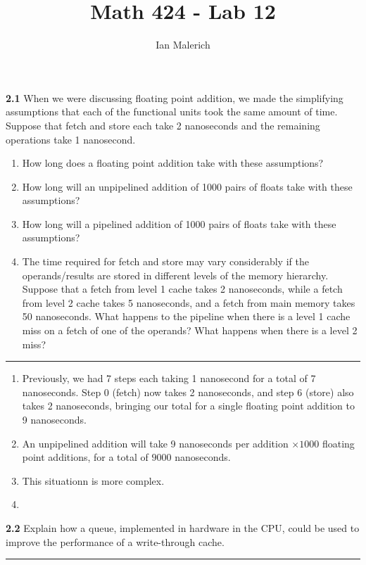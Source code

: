 \documentclass[12pt]{jhwhw}
\author{Ian Malerich}
\title{Math 424 - Lab 12}
\begin{document}
\raggedright


\textbf{2.1}
	When we were discussing floating point addition, we made the simplifying
	assumptions that each of the functional units took the same amount of time.
	Suppose that fetch and store each take 2 nanoseconds and the remaining
	operations take 1 nanosecond.
	\begin{enumerate}
		\item How long does a floating point addition take with these assumptions?
		\item How long will an unpipelined addition of 1000 pairs of floats take
			with these assumptions?
		\item How long will a pipelined addition of 1000 pairs of floats take with
			these assumptions?
		\item The time required for fetch and store may vary considerably if the 
			operands/results are stored in different levels of the memory hierarchy. 
			Suppose that a fetch from level 1 cache takes 2 nanoseconds,
			while a fetch from level 2 cache takes 5 nanoseconds, and a fetch
			from main memory takes 50 nanoseconds. What happens to the
			pipeline when there is a level 1 cache miss on a fetch of one of the 
			operands? What happens when there is a level 2 miss?
	\end{enumerate}
\textcolor[RGB]{240,240,240}{\rule{\textwidth}{0.5pt}}\bigbreak

	\begin{addmargin}[1em]{}
		\begin{enumerate}
			\item
				Previously, we had 7 steps each taking 1 nanosecond for a total of 7
				nanoseconds. Step 0 (fetch) now takes 2 nanoseconds, and 
				step 6 (store) also takes 2 nanoseconds, bringing our total for
				a single floating point addition to 9 nanoseconds.
			\item
				An unpipelined addition will take 9 nanoseconds per addition $\times 1000$ 
				floating point additions, for a total of $9000$ nanoseconds.
			\item
				This situationn is more complex.
			\item
		\end{enumerate}
	\end{addmargin}

\bigbreak
\textbf{2.2}
	Explain how a queue, implemented in hardware in the CPU, could be used to improve 
	the performance of a write-through cache.
\textcolor[RGB]{240,240,240}{\rule{\textwidth}{0.5pt}}\bigbreak

	\begin{addmargin}[1em]{}
	\end{addmargin}
\end{document}
